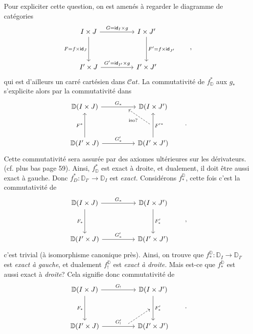\documentclass[11pt]{article}
\newcommand{\printedpage}[1]{\marginpar{\footnotesize p.~#1}}
\newcommand{\msp}[1]{\marginpar{\footnotesize [#1]}}
\newcommand{\Cat}{\mathcal{C}\mathit{at}}
\newcommand{\id}{\mathsf{id}}
\newcommand{\D}{\mathbb{D}}
\begin{document}
\printedpage{16}

\msp{page 22: blank}

\msp{page 23}

Pour expliciter cette question, on est amenés à regarder le diagramme de catégories
\[
\begin{tikzcd}[column sep=huge, row sep=huge]
I \times J \arrow[r, "G = \id_I \times g"] \arrow[d, "F = f \times \id_J"'] & I \times J' \arrow[d, "F' = f \times \id_{J'}"] \\
I' \times J \arrow[r, "G' = \id_{I'} \times g"] & I' \times J'
\end{tikzcd}
\qquad ,
\]
qui est d'ailleurs un carré cartésien dans $\Cat$. La commutativité de $f^*_{\D}$ aux $g_*$ s'explicite alors par la commutativité dans
\[
\begin{tikzcd}[column sep=huge, row sep=huge]
\D(I \times J) \arrow[r, "G_*", ""{name=T, below, near end}] & \D(I \times J') \\
\D(I' \times J) \arrow[u, "F^*"] \arrow[r, "G'_*"] & \D(I' \times J') \arrow[u, "{F'}^*"', ""{name=R, left}]
\arrow[dashed, from=R, to=T, "\text{iso?}"]
\end{tikzcd}
\qquad .
\]
Cette commutativité sera assurée par des axiomes ultérieures sur les dérivateurs. (cf. plus %
bas page 59). Ainsi, $f^*_{\D}$ est exact à droite, et dualement, il doit être aussi exact à gauche. Donc $f^*_D : \D_{I'} \to \D_I$ est \textit{exact.} Considérons $f^{\D}_*$, %
cette fois c'est la commutativité de
\[
\begin{tikzcd}[column sep=huge, row sep=huge]
\D(I \times J) \arrow[r, "G_*"] \arrow[d, "F_*"'] & \D(I \times J') \arrow[d, "F'_*"] \\
\D(I' \times J) \arrow[r, "G'_*"] & \D(I' \times J')
\end{tikzcd}
\qquad ,
\]
c'est trivial (à isomorphisme canonique près). Ainsi, on
\msp{page 24}
trouve que $f^{\D}_* : \D_I \to \D_{I'}$ est \textit{exact à gauche}, et dualement $f^{\D}_!$ est \textit{exact à droite.} Mais est-ce que $f^{\D}_*$ est aussi exact à \textit{droite}? Cela signifie donc commutativité de
\[
\begin{tikzcd}[column sep=huge, row sep=huge]
\D(I \times J) \arrow[r, "G_!"] \arrow[d, "F_*"'] & \D(I \times J') \arrow[d, "F'_*", ""{name=R2, left}] \\
\D(I' \times J) \arrow[r, "G'_!", ""{name=B, above, near end}] & \D(I' \times J')
\arrow[dashed, from=B, to=R2]
\end{tikzcd}
\qquad .
\]
\end{document}
